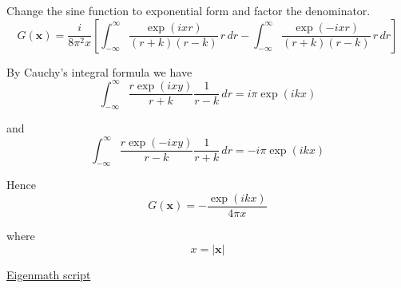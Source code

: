 Change the sine function to exponential form and factor the denominator.
\begin{equation*}
G(\mathbf x)
=\frac{i}{8\pi^2x}
\left[
\int_{-\infty}^\infty\frac{\exp(ixr)}{(r+k)(r-k)}\,r\,dr
-\int_{-\infty}^\infty\frac{\exp(-ixr)}{(r+k)(r-k)}\,r\,dr
\right]
\tag{4}
\end{equation*}

By Cauchy's integral formula we have
\begin{equation*}
\int_{-\infty}^\infty\frac{r\exp(ixy)}{r+k}\frac{1}{r-k}\,dr
=i\pi\exp(ikx)
\end{equation*}

and
\begin{equation*}
\int_{-\infty}^\infty\frac{r\exp(-ixy)}{r-k}\frac{1}{r+k}\,dr
=-i\pi\exp(ikx)
\end{equation*}

Hence
\begin{equation*}
G(\mathbf x)
=-\frac{\exp(ikx)}{4\pi x}
\tag{5}
\end{equation*}

where
\begin{equation*}
x=|\mathbf x|
\end{equation*}

\href{https://georgeweigt.github.io/examples/born-approximation-2-demo.html}{Eigenmath script}


